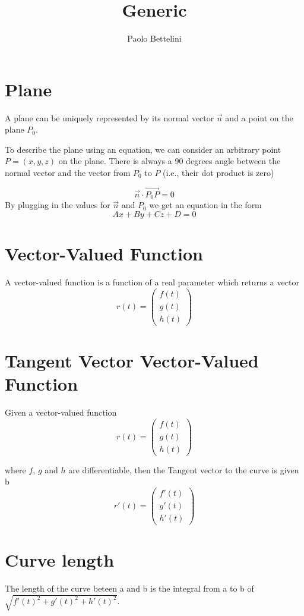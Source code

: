 \documentclass[a4paper]{article}
\title{Generic}
\author{Paolo Bettelini}
\date{}
\begin{document}
\section{Plane}

A plane can be uniquely represented by its
normal vector \(\vec{n}\)
and a point on the plane \(P_0\).

To describe the plane using an equation, we can
consider an arbitrary point \(P=(x,y,z)\) on the plane.
There is always a 90 degrees angle between the normal
vector and the vector from \(P_0\) to \(P\) (i.e., their dot product is zero)

\[
    \vec{n} \cdot \overrightarrow{P_0 P} = 0
\]
By plugging in the values for \(\vec{n}\) and \(P_0\)
we get an equation in the form
\[
    Ax+By+Cz+D=0
\]

\section{Vector-Valued Function}

A vector-valued function is a function of a real parameter
which returns a vector
\[
    r(t) = \begin{pmatrix}
        f(t) \\
        g(t) \\
        h(t)
    \end{pmatrix}
\]

\section{Tangent Vector Vector-Valued Function}

Given a vector-valued function
\[
    r(t) = \begin{pmatrix}
        f(t) \\
        g(t) \\
        h(t)
    \end{pmatrix}
\]

where \(f\), \(g\) and \(h\) are differentiable,
then the Tangent vector to the curve is given b
\[
    r'(t) = \begin{pmatrix}
        f'(t) \\
        g'(t) \\
        h'(t)
    \end{pmatrix}
\]

\section{Curve length}

The length of the curve beteen a and b is the integral from a to b of \(\sqrt{f'(t)^2+g'(t)^2+h'(t)^2}\).
\end{document}
